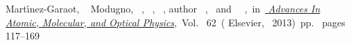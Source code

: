 \documentclass[aps,reprint,groupedaddress,showpacs,superscriptaddress]{revtex4-1}
\begin{document}
\begin{thebibliography}{52}
{{			{Mart{\'{\i}}nez-Garaot}},  {~\bibnamefont
			{Modugno}},  {~},
		 {~},
		 {~}, \bibinfo
		{author} {~}, \ and\ 
		{\ },\ }in\ \href {\doibase
		10.1016/b978-0-12-408090-4.00002-5} {\emph { {Advances In
				Atomic, Molecular, and Optical Physics}}},\ Vol.~ {62}\
	( {Elsevier},\  {2013})\ pp.\ \bibinfo
	{pages} {117--169}\BibitemShut {NoStop}%
\end{thebibliography}
\end{document}
